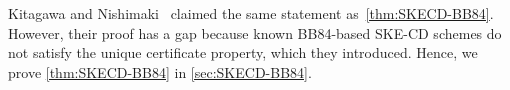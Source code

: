 Kitagawa and Nishimaki~\cite{AC:KitNis22} claimed the same statement as~\cref{thm:SKECD-BB84}.
However, their proof has a gap because known BB84-based SKE-CD schemes do not satisfy the unique certificate property, which they introduced. Hence, we prove \cref{thm:SKECD-BB84} in \cref{sec:SKECD-BB84}.


%






